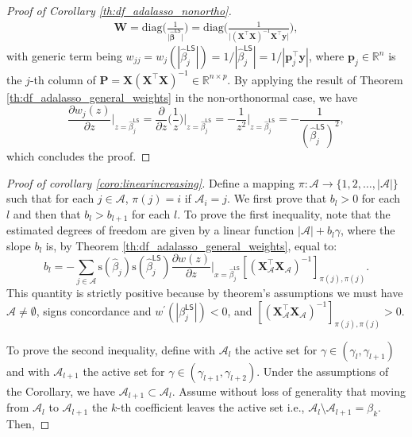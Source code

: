 \documentclass[a4paper, 12pt]{article}
\newcommand{\Aset}{\mathcal{A}}
\newcommand{\sgn}{\mathrm{s}}
\newcommand{\betahat}{\widehat{\boldsymbol\beta}}
\newcommand{\T}{\top}
\def\bp{\boldsymbol{p}}
\def\by{\boldsymbol{y}}
\def\bP{\mathbf{P}}
\def\bW{\mathbf{W}}
\def\bX{\mathbf{X}}
\def\bp{\mathbf{p}}
\def\by{\mathbf{y}}
\begin{document}
\begin{appendix}
\begin{proof}[Proof of Corollary \ref{th:df_adalasso_nonortho}]
\begin{equation*}
\begin{aligned}
\bW=\mathrm{diag}\Big(\frac{1}{\vert\betahat^{\mathsf{LS}}\vert}\Big)=\mathrm{diag}\Big(\frac{1}{\vert(\bX^{\T}\bX)^{-1}\bX^{\T}\by\vert}\Big),
\end{aligned}
\end{equation*}
with generic term being $w_{jj} = w_j(|\widehat{\beta}_j^\mathsf{LS}|) = 1/|\widehat{\beta}^{\mathsf{LS}}_j| =1/|\bp_j^{\T} \by|$, where $\bp_j\in\mathbb{R}^n$ is the $j$-th column of $\bP=\bX(\bX^{\T}\bX)^{-1}\in\mathbb{R}^{n\times p}$. By applying the result of Theorem \ref{th:df_adalasso_general_weights} in the non-orthonormal case, we have
\begin{equation*}
\frac{\partial w_j(z)}{\partial z} \bigg|_{z=\widehat{\beta}_j^\mathsf{LS}} = \frac{\partial}{\partial z} \bigg( \frac{1}{z}\bigg)\bigg|_{z=\widehat{\beta}_j^\mathsf{LS}} =  - \frac{1}{z^2}\bigg|_{z=\widehat{\beta}_j^\mathsf{LS}} =  - \frac{1}{(\widehat{\beta}_j^\mathsf{LS})^2},
\end{equation*}
which concludes the proof.
\end{proof}
%
\begin{proof}[Proof of corollary \ref{coro:linearincreasing}]
Define a mapping $\pi: \Aset \rightarrow\{1,2, \ldots,|\Aset|\}$ such that for each $j \in \Aset$, $\pi(j)=i$ if $\Aset_i=j$. We first prove that $b_l>0$ for each $l$ and then that $b_l > b_{l+1}$ for each $l$.
To prove the first inequality, note that the estimated degrees of freedom are given by a linear function $|\Aset| + b_l\gamma$, where the slope $b_l$ is, by Theorem \ref{th:df_adalasso_general_weights}, equal to:
\begin{equation*} 
b_l = -\sum_{j \in \Aset} \sgn({\widehat{\beta}_j})\sgn({\widehat{\beta}_j^\mathsf{LS}})\frac{\partial w(z)}{\partial z}\bigg|_{x=\widehat{\beta}_j^\mathsf{LS}}[(\bX_{\Aset}^{\T} \bX_{\Aset} )^{-1}]_{\pi(j),\pi(j)}.
\end{equation*} 
This quantity is strictly positive because by theorem's assumptions we must have $\Aset \neq \emptyset$, signs concordance and $w^\prime(|\beta_j^\mathsf{LS}|)<0$, and $[(\bX_{\Aset}^{\T} \bX_{\Aset} )^{-1}]_{\pi(j),\pi(j)}>0$.\par
%
To prove the second inequality, define with $\Aset_l$ the active set for $\gamma \in (\gamma_l, \gamma_{l+1})$ and with $\Aset_{l+1}$ the active set for $\gamma \in (\gamma_{l+1}, \gamma_{l+2})$. Under the assumptions of the Corollary, we have $\Aset_{l+1} \subset \Aset_{l}$. Assume without loss of generality that moving from $\Aset_{l}$ to $\Aset_{l+1}$ the $k$-th coefficient leaves the active set i.e., $\Aset_{l} \setminus \Aset_{l+1} = \beta_k$. Then,

\end{proof}
\end{appendix}
\end{document}
